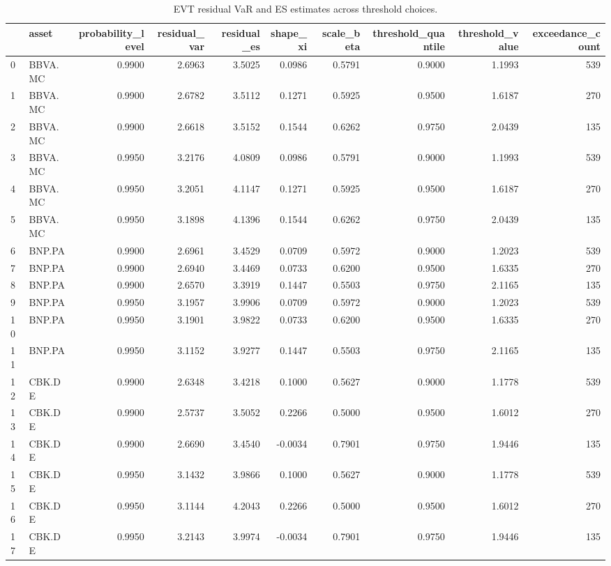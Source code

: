 \begin{table}
\caption{EVT residual VaR and ES estimates across threshold choices.}
\label{tab:evt_var_es_threshold_robustness}
\begin{tabular}{llrrrrrrrr}
\toprule
 & asset & probability_level & residual_var & residual_es & shape_xi & scale_beta & threshold_quantile & threshold_value & exceedance_count \\
\midrule
0 & BBVA.MC & 0.9900 & 2.6963 & 3.5025 & 0.0986 & 0.5791 & 0.9000 & 1.1993 & 539 \\
1 & BBVA.MC & 0.9900 & 2.6782 & 3.5112 & 0.1271 & 0.5925 & 0.9500 & 1.6187 & 270 \\
2 & BBVA.MC & 0.9900 & 2.6618 & 3.5152 & 0.1544 & 0.6262 & 0.9750 & 2.0439 & 135 \\
3 & BBVA.MC & 0.9950 & 3.2176 & 4.0809 & 0.0986 & 0.5791 & 0.9000 & 1.1993 & 539 \\
4 & BBVA.MC & 0.9950 & 3.2051 & 4.1147 & 0.1271 & 0.5925 & 0.9500 & 1.6187 & 270 \\
5 & BBVA.MC & 0.9950 & 3.1898 & 4.1396 & 0.1544 & 0.6262 & 0.9750 & 2.0439 & 135 \\
6 & BNP.PA & 0.9900 & 2.6961 & 3.4529 & 0.0709 & 0.5972 & 0.9000 & 1.2023 & 539 \\
7 & BNP.PA & 0.9900 & 2.6940 & 3.4469 & 0.0733 & 0.6200 & 0.9500 & 1.6335 & 270 \\
8 & BNP.PA & 0.9900 & 2.6570 & 3.3919 & 0.1447 & 0.5503 & 0.9750 & 2.1165 & 135 \\
9 & BNP.PA & 0.9950 & 3.1957 & 3.9906 & 0.0709 & 0.5972 & 0.9000 & 1.2023 & 539 \\
10 & BNP.PA & 0.9950 & 3.1901 & 3.9822 & 0.0733 & 0.6200 & 0.9500 & 1.6335 & 270 \\
11 & BNP.PA & 0.9950 & 3.1152 & 3.9277 & 0.1447 & 0.5503 & 0.9750 & 2.1165 & 135 \\
12 & CBK.DE & 0.9900 & 2.6348 & 3.4218 & 0.1000 & 0.5627 & 0.9000 & 1.1778 & 539 \\
13 & CBK.DE & 0.9900 & 2.5737 & 3.5052 & 0.2266 & 0.5000 & 0.9500 & 1.6012 & 270 \\
14 & CBK.DE & 0.9900 & 2.6690 & 3.4540 & -0.0034 & 0.7901 & 0.9750 & 1.9446 & 135 \\
15 & CBK.DE & 0.9950 & 3.1432 & 3.9866 & 0.1000 & 0.5627 & 0.9000 & 1.1778 & 539 \\
16 & CBK.DE & 0.9950 & 3.1144 & 4.2043 & 0.2266 & 0.5000 & 0.9500 & 1.6012 & 270 \\
17 & CBK.DE & 0.9950 & 3.2143 & 3.9974 & -0.0034 & 0.7901 & 0.9750 & 1.9446 & 135 \\

\end{tabular}
\end{table}
